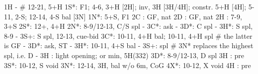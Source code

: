 1H -  # 12-21, 5+H
1S*: F1; 4-6, 3+H [2H]; inv, 3H [3H/4H]; constr. 5+H [4H]; 5-11, 2-S; 12-14, 4-S bal [3N]
1N*: 5+S, F1
2C : GF, nat
2D : GF, nat
2H : 7-9, 3+S
2S*: 12+, 4+H
2N*: 8-9/12-13, C/S spl
   - 3C*: ask
        - 3D*: C spl
        - 3H*: S spl, 8-9
        - 3S+: S spl, 12-13, cue-bid
3C*: 10-11, 4+H bal; 10-11, 4+H spl  # the latter is GF
   - 3D*: ask, ST
        - 3H*: 10-11, 4+S bal
        - 3S+: spl  # 3N* replaces the highest spl, i.e. D
   - 3H : light opening; or min, 5H(332)
3D*: 8-9/12-13, D spl
3H : pre
3S*: 10-12, S void
3N*: 12-14, 3H, bal w/o 6m, CoG
4X*: 10-12, X void
4H : pre